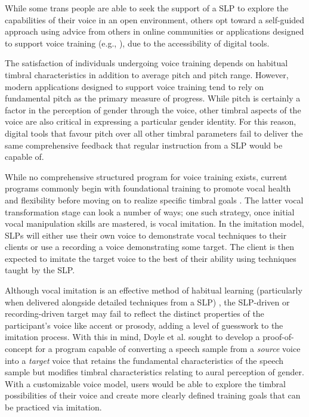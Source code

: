 \documentclass{article}
\begin{document}
While some trans people are able to seek the support of a SLP to explore the capabilities of their voice in an open environment, others opt toward a self-guided approach using advice from others in online communities \cite{kowalchuck2020} or applications designed to support voice training (e.g., \cite{devextras2018, nitzandseek2020, speechtools2013}), due to the accessibility of digital tools.

The satisfaction of individuals undergoing voice training depends on habitual timbral characteristics in addition to average pitch and pitch range. However, modern applications designed to support voice training \cite{devextras2018, nitzandseek2020, speechtools2013} tend to rely on fundamental pitch as the primary measure of progress. While pitch is certainly a factor in the perception of gender through the voice, other timbral aspects of the voice are also critical in expressing a particular gender identity. For this reason, digital tools that favour pitch over all other timbral parameters fail to deliver the same comprehensive feedback that regular instruction from a SLP would be capable of.

While no comprehensive structured program for voice training exists, current programs commonly begin with foundational training to promote vocal health and flexibility before moving on to realize specific timbral goals \cite{oates2023}. The latter vocal transformation stage can look a number of ways; one such strategy, once initial vocal manipulation skills are mastered, is vocal imitation. In the imitation model, SLPs will either use their own voice to demonstrate vocal techniques to their clients or use a recording a voice demonstrating some target. The client is then expected to imitate the target voice to the best of their ability using techniques taught by the SLP.

Although vocal imitation is an effective method of habitual learning (particularly when delivered alongside detailed techniques from a SLP) \cite{ohlsson2024}, the SLP-driven or recording-driven target may fail to reflect the distinct properties of the participant's voice like accent or prosody, adding a level of guesswork to the imitation process. With this in mind, Doyle et al. \cite{doyle2025} sought to develop a proof-of-concept for a program capable of converting a speech sample from a \textit{source} voice into a \textit{target} voice that retains the fundamental characteristics of the speech sample but modifies timbral characteristics relating to aural perception of gender. With a customizable voice model, users would be able to explore the timbral possibilities of their voice and create more clearly defined training goals that can be practiced via imitation.
\end{document}

